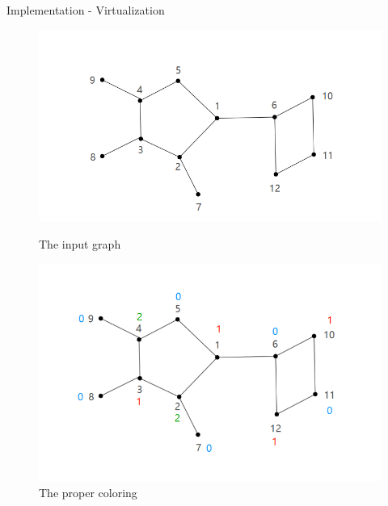 \documentclass{beamer}
\begin{document}
\begin{frame}{Implementation - Virtualization}
    \begin{figure}[htbp]
\centering
\begin{minipage}[t]{0.48\textwidth}
\centering
\includegraphics[width=1\textwidth]{figure/input.png}
\caption{\footnotesize The input graph}
\end{minipage}
\begin{minipage}[t]{0.48\textwidth}
\centering
\includegraphics[width=1\textwidth]{figure/propercoloring.png}
\caption{\footnotesize The proper coloring}
\end{minipage}
\end{figure}
\end{frame}
\end{document}
